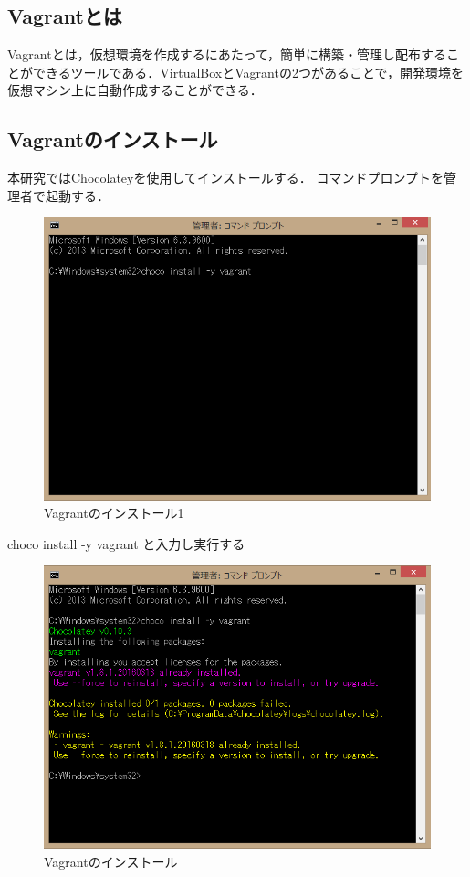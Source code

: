 \subsection{Vagrantとは}
Vagrantとは，仮想環境を作成するにあたって，簡単に構築・管理し配布することができるツールである．VirtualBoxとVagrantの2つがあることで，開発環境を仮想マシン上に自動作成することができる．


\subsection{Vagrantのインストール}
本研究ではChocolateyを使用してインストールする．
コマンドプロンプトを管理者で起動する．

\begin{figure}[h]
\centering
\includegraphics[width=12cm]{vagrant1.PNG}
\caption{Vagrantのインストール1}\label{サンプル図}
\end{figure}

choco install -y vagrant と入力し実行する

\newpage

\begin{figure}[h]
\centering
\includegraphics[width=12cm]{vagrant2.PNG}
\caption{Vagrantのインストール}\label{サンプル図}
\end{figure}

